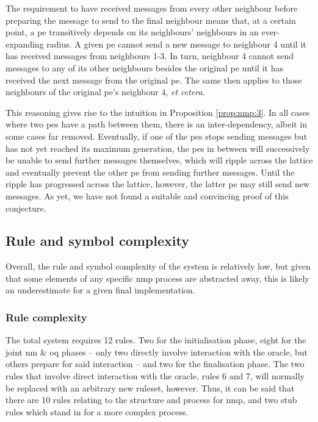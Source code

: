 The requirement to have received messages from every other neighbour before preparing the message to send to the final neighbour means that, at a certain point, a \gls{pe} transitively depends on its neighbours' neighbours in an ever-expanding radius.  A given \gls{pe} cannot send a new message to neighbour 4 until it has received messages from neighbours 1-3.  In turn, neighbour 4 cannot send messages to any of its other neighbours besides the original \gls{pe} until it has received the next message from the original \gls{pe}.  The same then applies to those neighbours of the original \gls{pe}'s neighbour 4, \textit{et cetera}.

This reasoning gives rise to the intuition in Proposition \ref{prop:nmp:3}.  In all cases where two \glspl{pe} have a path between them, there is an inter-dependency, albeit in some cases far removed.  Eventually, if one of the \glspl{pe} stops sending messages but has not yet reached its maximum generation, the \glspl{pe} in between will successively be unable to send further messages themselves, which will ripple across the lattice and eventually prevent the other \gls{pe} from sending further messages.  Until the ripple has progressed across the lattice, however, the latter \gls{pe} may still send new messages.  As yet, we have not found a suitable and convincing proof of this conjecture.

\subsection{Rule and symbol complexity}
Overall, the rule and symbol complexity of the system is relatively low, but given that some elements of any specific \gls{nmp} process are abstracted away, this is likely an underestimate for a given final implementation.

\subsubsection{Rule complexity}
The total system requires 12 rules.  Two for the initialisation phase, eight for the joint \gls{nm} \& \gls{oq} phases -- only two directly involve interaction with the oracle, but others prepare for said interaction -- and two for the finalisation phase.  The two rules that involve direct interaction with the oracle, rules 6 and 7, will normally be replaced with an arbitrary new ruleset, however.  Thus, it can be said that there are 10 rules relating to the structure and process for \gls{nmp}, and two stub rules which stand in for a more complex process.

